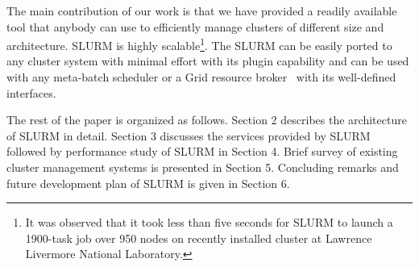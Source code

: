 The main contribution of our work is that we have provided a readily available
tool that anybody can use to efficiently manage clusters of different size and architecture.
SLURM is highly scalable\footnote{It was observed that it took less than five seconds for SLURM to launch a 1900-task job over 950 nodes on recently installed cluster at Lawrence Livermore National Laboratory.}.
The SLURM can be easily ported to any cluster system with minimal effort with its plugin
capability and can be used with any meta-batch scheduler or a Grid resource broker~\cite{Gridbook}
with its well-defined interfaces.

The rest of the paper is organized as follows.
Section 2 describes the architecture of SLURM in detail. Section 3 discusses the services provided by SLURM followed by performance study of
SLURM in Section 4. Brief survey of existing cluster management systems is presented in Section 5.
Concluding remarks and future development plan of SLURM is given in Section 6.
